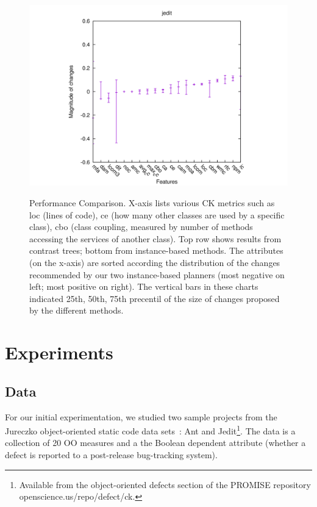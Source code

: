 \documentclass[conference]{IEEEtran}
\begin{document}
\begin{figure}[!t]
\begin{minipage}{0.5\linewidth}
{				\includegraphics[width=\linewidth]{jedit2.png}}
		\end{minipage}
		\caption{Performance Comparison.
		X-axis lists various CK metrics such as loc (lines of code),
		ce (how many other classes are used by a specific class),
		cbo (class coupling, measured by number of methods accessing
		the services of another class). Top row shows results from contrast
		trees; bottom from instance-based methods. The attributes (on the x-axis)
		are sorted according the distribution of the changes recommended by 
		our two instance-based planners (most negative on left; most positive on right). The vertical bars in these charts indicated 25th, 50th, 75th precentil of the size of changes proposed by the different methods.}
		\label{fig:deltas}
	\end{figure}
	
	
	\section{Experiments}
	\subsection{Data}
	For our initial experimentation, we studied two sample projects from the Jureczko object-oriented static code data sets~\cite{jureczko10}: Ant and  Jedit\footnote{Available from the object-oriented defects section of the PROMISE repository openscience.us/repo/defect/ck.}. The data is a collection of 20 OO measures and a the Boolean dependent attribute (whether a defect is reported to a post-release bug-tracking system). 
	
\end{document}

